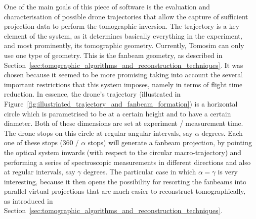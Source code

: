 One of the main goals of this piece of software is the evaluation and
characterisation of possible drone trajectories that allow the capture
of sufficient projection data to perform the tomographic inversion. The
trajectory is a key element of the system, as it determines basically
everything in the experiment, and most prominently, its tomographic
geometry. Currently, Tomosim can only use one type of geometry. This is
the fanbeam geometry, as described in
Section~\ref{sec:tomographic_algorithms_and_reconstruction_techniques}.
It was chosen because it seemed to be more promising taking into account
the several important restrictions that this system imposes, namely in
terms of flight time reduction. In essence, the drone's trajectory
(illustrated in
Figure~\ref{fig:illustriated_trajectory_and_fanbeam_formation}) is a
horizontal circle which is parametrised to be at a certain height and to
have a certain diameter.  Both of these dimensions are set at experiment
/ measurement time. The drone stops on this circle at regular angular
intervals, say $\alpha$ degrees. Each one of these stops (360 / $\alpha$
stops) will generate a fanbeam projection, by pointing the optical
system inwards (with respect to the circular macro-trajectory) and
performing a series of spectroscopic measurements in different
directions and also at regular intervals, say $\gamma$ degrees. The
particular case in which $\alpha = \gamma$ is very interesting, because
it then opens the possibility for resorting the fanbeams into parallel
virtual-projections that are much easier to reconstruct tomographically,
as introduced in
Section~\ref{sec:tomographic_algorithms_and_reconstruction_techniques}.  

